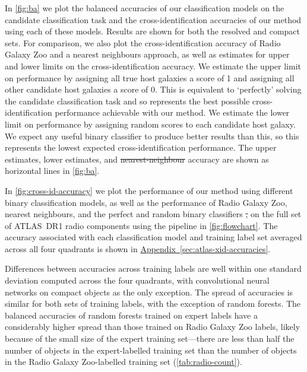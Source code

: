 \documentclass[11pt, a4paper]{book}
\newcommand{\aref}[1]{\hyperref[#1]{Appendix~\ref{#1}}}
\providecommand{\DIFaddtex}[1]{{\protect\color{blue}\uwave{#1}}} %
\providecommand{\DIFdeltex}[1]{{\protect\color{red}\sout{#1}}}                      %
\providecommand{\DIFaddbegin}{} %
\providecommand{\DIFaddend}{} %
\providecommand{\DIFdelbegin}{} %
\providecommand{\DIFdelend}{} %
\providecommand{\DIFadd}[1]{\texorpdfstring{\DIFaddtex{#1}}{#1}} %
\providecommand{\DIFdel}[1]{\texorpdfstring{\DIFdeltex{#1}}{}} %
\newcommand{\DIFscaledelfig}{0.5}
\newlength{\DIFdelgraphicswidth} %
\newlength{\DIFdelgraphicsheight} %
\newcommand{\DIFaddincludegraphics}[2][]{{\color{blue}\fbox{\DIFOincludegraphics[#1]{#2}}}} %
\newcommand{\DIFdelincludegraphics}[2][]{%
\sbox{\DIFdelgraphicsbox}{\DIFOincludegraphics[#1]{#2}}%
\settoboxwidth{\DIFdelgraphicswidth}{\DIFdelgraphicsbox} %
\settoboxtotalheight{\DIFdelgraphicsheight}{\DIFdelgraphicsbox} %
\scalebox{\DIFscaledelfig}{%
\parbox[b]{\DIFdelgraphicswidth}{\usebox{\DIFdelgraphicsbox}\\[-\baselineskip] \rule{\DIFdelgraphicswidth}{0em}}\llap{\resizebox{\DIFdelgraphicswidth}{\DIFdelgraphicsheight}{%
\setlength{\unitlength}{\DIFdelgraphicswidth}%
\begin{picture}(1,1)%
\thicklines\linethickness{2pt} %
{\color[rgb]{1,0,0}\put(0,0){\framebox(1,1){}}}%
{\color[rgb]{1,0,0}\put(0,0){\line( 1,1){1}}}%
{\color[rgb]{1,0,0}\put(0,1){\line(1,-1){1}}}%
\end{picture}%
}\hspace*{3pt}}} %
} %
\DeclareRobustCommand{\DIFaddbegin}{\DIFOaddbegin \let\includegraphics\DIFaddincludegraphics} %
\DeclareRobustCommand{\DIFaddend}{\DIFOaddend \let\includegraphics\DIFOincludegraphics} %
\DeclareRobustCommand{\DIFdelbegin}{\DIFOdelbegin \let\includegraphics\DIFdelincludegraphics} %
\DeclareRobustCommand{\DIFdelend}{\DIFOaddend \let\includegraphics\DIFOincludegraphics} %
\begin{document}
    In \autoref{fig:ba} we plot {the balanced accuracies of our classification models
    on the candidate classification task and the cross-identification
    accuracies of our method using each of these models. Results are shown for both
    the resolved and compact sets.} For comparison, we also plot the cross-identification accuracy of Radio Galaxy
    Zoo and a nearest neighbours approach, as well as estimates for upper and
    lower limits on the cross-identification accuracy. {We estimate the upper limit on performance by assigning all
    true host galaxies a score of 1 and
    assigning all other candidate host galaxies a score of 0. This
    is equivalent to `perfectly' solving the candidate classification task and so
    represents the best possible cross-identification performance achievable
    with our method. We estimate the lower limit on performance by {
    assigning random scores to each candidate host galaxy}. We expect any
    useful binary classifier to produce better
    results than this, so this represents the lowest expected
    cross-identification performance.} The upper estimates, lower estimates,
    and \DIFdelbegin \DIFdel{nearest-neighbour }\DIFdelend \DIFaddbegin \DIFadd{nearest neighbour }\DIFaddend accuracy are shown as horizontal lines in
    \autoref{fig:ba}.

    In \autoref{fig:cross-id-accuracy} we plot the performance {of our
    method using different binary classification models}, as well as the
    performance of Radio Galaxy Zoo, nearest neighbours, and the perfect and
    random binary classifiers \DIFdelbegin \DIFdel{, }\DIFdelend on the full set of ATLAS~DR1 radio components
    using the pipeline in \autoref{fig:flowchart}. The accuracy
    {associated with each classification model} and training label set
    averaged across all four quadrants is shown in \aref{sec:atlas-xid-accuracies}.

    Differences between accuracies across training labels are well within one
    standard deviation computed across the four quadrants, with convolutional
    neural networks on compact objects as the only exception. The spread of
    accuracies is similar for both sets of training labels, with the exception
    of random forests. The balanced accuracies of random forests trained on
    expert labels have a considerably higher spread than those trained on
    Radio Galaxy Zoo labels, likely because of the small size of the expert
    training set---there are less than half the number of objects in the
    expert-labelled training set than the number of objects in the Radio
    Galaxy Zoo-labelled training set (\autoref{tab:radio-count}).
\end{document}
